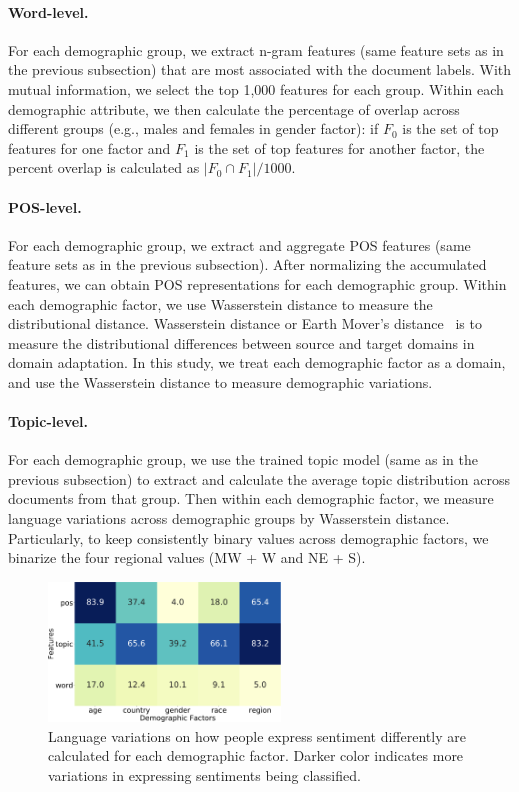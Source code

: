 \paragraph{Word-level.} For each demographic group, we extract n-gram features (same feature sets as in the previous subsection) that are most associated with the document labels. With mutual information, we select the top 1,000 features for each group. Within each demographic attribute, we then calculate the percentage of overlap across different groups (e.g., males and females in gender factor): if $F_0$ is the set of top features for one factor and $F_1$ is the set of top features for another factor, the percent overlap is calculated as $|F_0 \cap F_1|/1000$.

\paragraph{POS-level.} For each demographic group, we extract and aggregate POS features (same feature sets as in the previous subsection). After normalizing the accumulated features, we can obtain POS representations for each demographic group. Within each demographic factor, we use Wasserstein distance to measure the distributional distance. Wasserstein distance or Earth Mover's distance~\cite{vallender1974calculation} is to measure the distributional differences between source and target domains in domain adaptation. In this study, we treat each demographic factor as a domain, and use the Wasserstein distance to measure demographic variations.

\paragraph{Topic-level.} For each demographic group, we use the trained topic model (same as in the previous subsection) to extract and calculate the average topic distribution across documents from that group. Then within each demographic factor, we measure language variations across demographic groups by Wasserstein distance. Particularly, to keep consistently binary values across demographic factors, we binarize the four regional values (MW + W and NE + S).

\begin{figure}[htp]
\centering
\includegraphics[width=0.55\textwidth]{images/chapter5/overlaps.pdf}
\caption{Language variations on how people express sentiment differently are calculated for each demographic factor. Darker color indicates more variations in expressing sentiments being classified.}
\label{fig:overlaps}
\end{figure}


